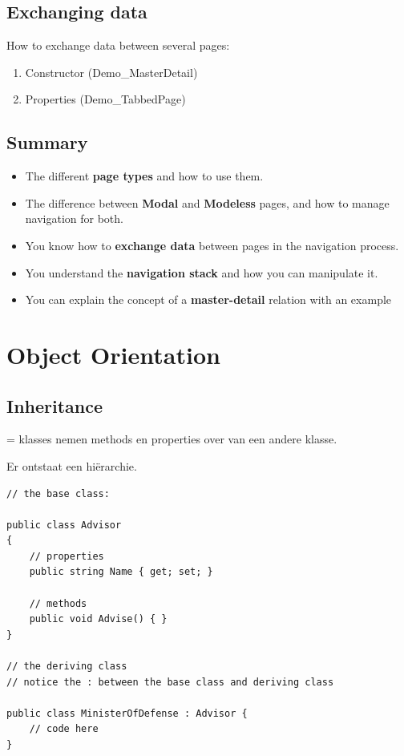 \documentclass{article}
\newcommand{\bold}[1]{\textbf{#1}}
\begin{document}
\subsection{Exchanging data}

How to exchange data between several pages:

\begin{enumerate}
    \item Constructor (Demo\_MasterDetail)
    \item Properties (Demo\_TabbedPage)
\end{enumerate}

\subsection{Summary}

\begin{itemize}
    \item The different \bold{page types} and how to use them.
    \item The difference between \bold{Modal} and \bold{Modeless} pages, and how to manage navigation for both.
    \item You know how to \bold{exchange data} between pages in the navigation process.
    \item You understand the \bold{navigation stack} and how you can manipulate it.
    \item You can explain the concept of a \bold{master-detail} relation with an example
\end{itemize}

\section{Object Orientation}

\subsection{Inheritance}

= klasses nemen methods en properties over van een andere klasse. 

Er ontstaat een hi\"erarchie.

\begin{verbatim}
// the base class: 

public class Advisor
{
    // properties
    public string Name { get; set; }

    // methods
    public void Advise() { }
}

// the deriving class
// notice the : between the base class and deriving class

public class MinisterOfDefense : Advisor {
    // code here
}

\end{verbatim}
\end{document}
